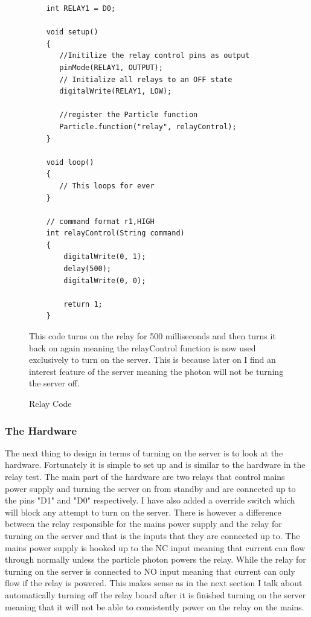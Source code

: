\documentclass{article}
\begin{document}
\begin{figure}
    \begin{lstlisting}
    int RELAY1 = D0;

    void setup()
    {
       //Initilize the relay control pins as output
       pinMode(RELAY1, OUTPUT);
       // Initialize all relays to an OFF state
       digitalWrite(RELAY1, LOW);

       //register the Particle function
       Particle.function("relay", relayControl);
    }

    void loop()
    {
       // This loops for ever
    }

    // command format r1,HIGH
    int relayControl(String command)
    {
        digitalWrite(0, 1);
        delay(500);
        digitalWrite(0, 0);

        return 1;
    }
    \end{lstlisting}
    \caption{Relay Code} \label{fig:relayCode}
    \vspace{0.5cm}
    This code turns on the relay for 500 milliseconds and then turns it back on again
    meaning the relayControl function is now used exclusively to turn on the server.
    This is because later on I find an interest feature of the server meaning the photon
    will not be turning the server off.

\end{figure}

\subsubsection{The Hardware}
The next thing to design in terms of turning on the server is to look at the hardware.
Fortunately it is simple to set up and is similar to the hardware in the relay test. The main
part of the hardware are two relays that control mains power supply and turning the server on
from standby and are connected up to the pins "D1" and "D0" respectively. I have also added a
override switch which will block any attempt to turn on the server. There is however a difference
between the relay responsible for the mains power supply and the relay for turning on the server
and that is the inputs that they are connected up to. The mains power supply is hooked up to the NC
input meaning that current can flow through normally unless the particle photon powers the relay. While
the relay for turning on the server is connected to NO input meaning that current can only flow
if the relay is powered. This makes sense as in the next section I talk about automatically turning
off the relay board after it is finished turning on the server meaning that it will not be able to
consistently power on the relay on the mains.
\end{document}
